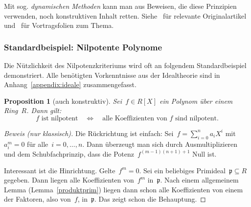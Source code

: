 \documentclass[a4paper,ngerman,12pt]{scrartcl}
\theoremstyle{definition}
\theoremstyle{plain}
\newtheorem{prop}[defn]{Proposition}
\theoremstyle{remark}
\newcommand{\pp}{\mathfrak{p}}
\renewcommand{\_}{\mathpunct{.}\,}
\newcommand{\?}{\,{:}\,}
\begin{document}
Mit sog. \emph{dynamischen Methoden} kann man aus Beweisen, die diese
Prinzipien verwenden, noch konstruktiven Inhalt retten.
Siehe~\cite{clr:dynamicalmethod,cl:logical} für relevante Originalartikel
und~\cite{coquand:sitesur,lombardi:hilbertworks} für Vortragsfolien zum Thema.


\subsubsection*{Standardbeispiel: Nilpotente Polynome}
\label{bsp:nilpotentepolynome}

Die Nützlichkeit des Nilpotenzkriteriums wird oft an folgendem Standardbeispiel
demonstriert. Alle benötigten Vorkenntnisse aus der Idealtheorie sind in
Anhang~\ref{appendix:ideale} zusammengefasst.

\begin{prop}[auch konstruktiv]Sei~$f \in R[X]$ ein Polynom über einem Ring~$R$. Dann gilt:
\[ \text{$f$ ist nilpotent} \quad\Longleftrightarrow\quad
  \text{alle Koeffizienten von~$f$ sind nilpotent}. \]
\end{prop}
\begin{proof}[Beweis (nur klassisch)]Die Rückrichtung ist einfach: Sei~$f = \sum_{i=0}^n a_i X^i$
mit~$a_i^m = 0$ für alle~$i = 0,\ldots,n$. Dann überzeugt man sich durch
Ausmultiplizieren und dem Schubfachprinzip, dass die Potenz~$f^{(m-1)(n+1) +
1}$ Null ist.

Interessant ist die Hinrichtung. Gelte~$f^m = 0$. Sei ein beliebiges
Primideal~$\pp \subseteq R$ gegeben. Dann liegen alle Koeffizienten von~$f^m$
in~$\pp$. Nach einem allgemeinem Lemma (Lemma~\ref{produktprim}) liegen dann
schon alle Koeffizienten von einem der Faktoren, also von~$f$, in~$\pp$. Das
zeigt schon die Behauptung.
\end{proof}
\end{document}
